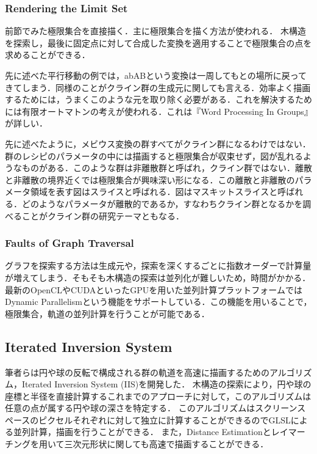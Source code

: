 \subsubsection{Rendering the Limit Set}
前節でみた極限集合を直接描く．主に極限集合を描く方法が使われる．
木構造を探索し，最後に固定点に対して合成した変換を適用することで極限集合の点を求めることができる．

先に述べた平行移動の例では，abABという変換は一周してもとの場所に戻ってきてしまう．同様のことがクライン群の生成元に関しても言える．効率よく描画するためには，うまくこのような元を取り除く必要がある．これを解決するためには有限オートマトンの考えが使われる．これは『Word Processing In Groups』\cite{wordProcessing}が詳しい．

先に述べたように，メビウス変換の群すべてがクライン群になるわけではない．群のレシピのパラメータの中には描画すると極限集合が収束せず，図が乱れるようなものがある．このような群は非離散群と呼ばれ，クライン群ではない．離散と非離散の境界近くでは極限集合が興味深い形になる．この離散と非離散のパラメータ領域を表す図はスライスと呼ばれる．図はマスキットスライスと呼ばれる．どのようなパラメータが離散的であるか，すなわちクライン群となるかを調べることがクライン群の研究テーマともなる．

\subsubsection{Faults of Graph Traversal}
グラフを探索する方法は生成元や，探索を深くするごとに指数オーダーで計算量が増えてしまう．そもそも木構造の探索は並列化が難しいため，時間がかかる．
最新のOpenCLやCUDAといったGPUを用いた並列計算プラットフォームではDynamic Parallelismという機能をサポートしている．この機能を用いることで，極限集合，軌道の並列計算を行うことが可能である．

\subsection{Iterated Inversion System}
筆者らは円や球の反転で構成される群の軌道を高速に描画するためのアルゴリズム，Iterated Inversion System (IIS)\cite{iis}を開発した．
木構造の探索により，円や球の座標と半径を直接計算するこれまでのアプローチに対して，このアルゴリズムは任意の点が属する円や球の深さを特定する．
このアルゴリズムはスクリーンスペースのピクセルそれぞれに対して独立に計算することができるのでGLSLによる並列計算，描画を行うことができる．
また，Distance Estimationとレイマーチングを用いて三次元形状に関しても高速で描画することができる．


